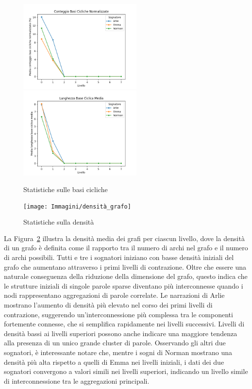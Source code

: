 \begin{figure}[t]
    \hspace{-5pt}
    \includegraphics[width=0.55\textwidth]{Immagini/conteggio_basi_cicliche_normalizzate}
    \hspace{-20pt}
    \includegraphics[width=0.55\textwidth]{Immagini/lunghezza_base_ciclica_media}
    \hspace{-5pt}
    \vspace{-10pt}
    \caption{Statistiche sulle basi cicliche}\label{fig:cycle_basis}
\end{figure}

\begin{figure}
    \texttt{[image: Immagini/densità\_grafo]}
    \caption{Statistiche sulla densità}\label{fig:density}
\end{figure}

La Figura~\ref{fig:density} illustra la densità media dei grafi per ciascun livello, dove la densità di un grafo è
definita come il rapporto tra il numero di archi nel grafo e il numero di archi possibili.
Tutti e tre i sognatori iniziano con basse densità iniziali del grafo che aumentano attraverso i primi livelli di
contrazione.
Oltre che essere una naturale conseguenza della riduzione della dimensione del grafo, questo indica che le strutture
iniziali di singole parole sparse diventano più interconnesse quando i nodi rappresentano aggregazioni di parole
correlate.
Le narrazioni di Arlie mostrano l'aumento di densità più elevato nel corso dei primi livelli di contrazione,
suggerendo un'interconnessione più complessa tra le componenti fortemente connesse, che si semplifica
rapidamente nei livelli successivi.
Livelli di densità bassi ai livelli superiori possono anche indicare una maggiore tendenza alla presenza di
un unico grande cluster di parole.
Osservando gli altri due sognatori, è interessante notare che, mentre i sogni di Norman mostrano una densità più alta
rispetto a quelli di Emma nei livelli iniziali, i dati dei due sognatori convergono a valori simili nei livelli
superiori, indicando un livello simile di interconnessione tra le aggregazioni principali.

